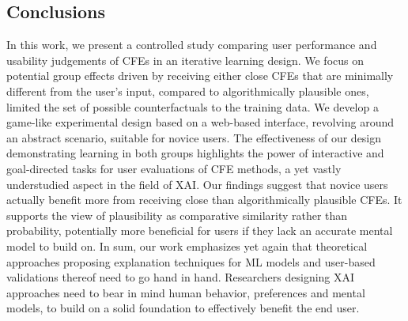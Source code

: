 \subsection{Conclusions}\label{subsec:conclusion}
In this work, we present a controlled study comparing user performance and usability judgements of \glspl{CFE} in an iterative learning design.
We focus on potential group effects driven by receiving either close \glspl{CFE} that are minimally different from the user’s input, compared to algorithmically plausible ones, limited the set of possible counterfactuals to the training data.
We develop a game-like experimental design based on a web-based interface, revolving around an abstract scenario, suitable for novice users.
The effectiveness of our design demonstrating learning in both groups highlights the power of interactive and goal-directed tasks for user evaluations of \gls{CFE} methods, a yet vastly understudied aspect in the field of \gls{XAI}.
Our findings suggest that novice users actually benefit more from receiving close than algorithmically plausible \glspl{CFE}.
It supports the view of plausibility as comparative similarity rather than probability, potentially more beneficial for users if they lack an accurate mental model to build on.
In sum, our work emphasizes yet again that theoretical approaches proposing explanation techniques for \gls{ML} models and user-based validations thereof need to go hand in hand.
Researchers designing \gls{XAI} approaches need to bear in mind human behavior, preferences and mental models, to build on a solid foundation to effectively benefit the end user.

